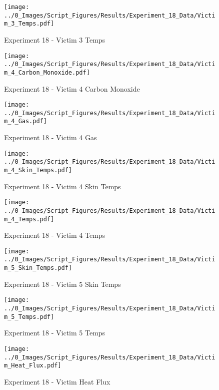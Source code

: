	\begin{figure}[H]
		\centering
		\texttt{[image: ../0\_Images/Script\_Figures/Results/Experiment\_18\_Data/Victim\_3\_Temps.pdf]}
		\caption[]{Experiment 18 - Victim 3 Temps}
	\end{figure}
 
	\clearpage

	\begin{figure}[H]
		\centering
		\texttt{[image: ../0\_Images/Script\_Figures/Results/Experiment\_18\_Data/Victim\_4\_Carbon\_Monoxide.pdf]}
		\caption[]{Experiment 18 - Victim 4 Carbon Monoxide}
	\end{figure}
 

	\begin{figure}[H]
		\centering
		\texttt{[image: ../0\_Images/Script\_Figures/Results/Experiment\_18\_Data/Victim\_4\_Gas.pdf]}
		\caption[]{Experiment 18 - Victim 4 Gas}
	\end{figure}
 
	\clearpage

	\begin{figure}[H]
		\centering
		\texttt{[image: ../0\_Images/Script\_Figures/Results/Experiment\_18\_Data/Victim\_4\_Skin\_Temps.pdf]}
		\caption[]{Experiment 18 - Victim 4 Skin Temps}
	\end{figure}
 

	\begin{figure}[H]
		\centering
		\texttt{[image: ../0\_Images/Script\_Figures/Results/Experiment\_18\_Data/Victim\_4\_Temps.pdf]}
		\caption[]{Experiment 18 - Victim 4 Temps}
	\end{figure}
 
	\clearpage

	\begin{figure}[H]
		\centering
		\texttt{[image: ../0\_Images/Script\_Figures/Results/Experiment\_18\_Data/Victim\_5\_Skin\_Temps.pdf]}
		\caption[]{Experiment 18 - Victim 5 Skin Temps}
	\end{figure}
 

	\begin{figure}[H]
		\centering
		\texttt{[image: ../0\_Images/Script\_Figures/Results/Experiment\_18\_Data/Victim\_5\_Temps.pdf]}
		\caption[]{Experiment 18 - Victim 5 Temps}
	\end{figure}
 
	\clearpage

	\begin{figure}[H]
		\centering
		\texttt{[image: ../0\_Images/Script\_Figures/Results/Experiment\_18\_Data/Victim\_Heat\_Flux.pdf]}
		\caption[]{Experiment 18 - Victim Heat Flux}
	\end{figure}
 

